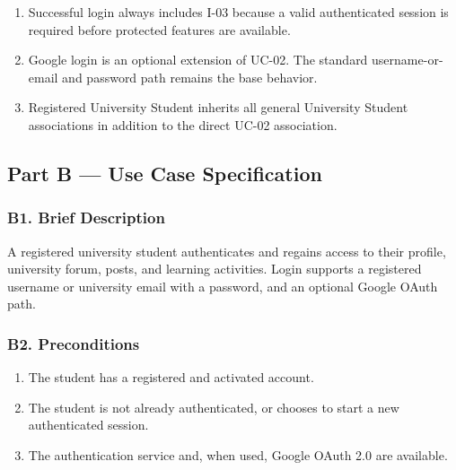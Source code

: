 \documentclass[12pt]{article}
\begin{document}
\begin{enumerate}
\item Successful login always includes I-03 because a valid authenticated session is required before protected features are available.
\item Google login is an optional extension of UC-02. The standard username-or-email and password path remains the base behavior.
\item Registered University Student inherits all general University Student associations in addition to the direct UC-02 association.
\end{enumerate}
\par\medskip

\hypertarget{sec:part-b-use-case-specification}{}
\subsection*{Part B --- Use Case Specification}
\par\medskip

\hypertarget{sec:b1-brief-description}{}
\subsubsection*{B1. Brief Description}
\par\medskip

A registered university student authenticates and regains access to their profile, university forum, posts, and learning activities. Login supports a registered username or university email with a password, and an optional Google OAuth path.
\par\medskip

\hypertarget{sec:b2-preconditions}{}
\subsubsection*{B2. Preconditions}
\par\medskip

\begin{enumerate}
\item The student has a registered and activated account.
\item The student is not already authenticated, or chooses to start a new authenticated session.
\item The authentication service and, when used, Google OAuth 2.0 are available.
\end{enumerate}
\par\medskip
\end{document}

